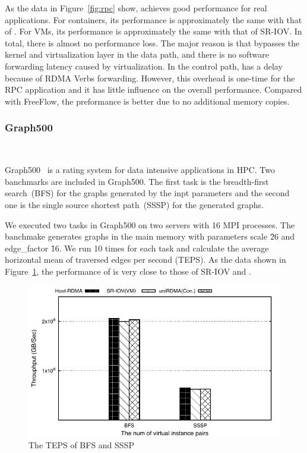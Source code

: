 As the data in Figure~\ref{fig:rpc} show, \sys achieves good performance for real applications. For containers, its performance is approximately the same with that of \native. For VMs, its performance is approximately the same with that of SR-IOV. In total, there is almost no performance loss. The major reason is that \sys bypasses the kernel and virtualization layer in the data path, and there is no software forwarding latency caused by virtualization. In the control path, \sys has a delay because of RDMA Verbs forwarding. However, this overhead is one-time for the RPC application and it has little influence on the overall performance. Compared with FreeFlow, the preformance \sys is better due to no additional memory copies. 



\subsubsection{\textbf{Graph500}}
\
\noindent

Graph500~\cite{Graph500} is a rating system for data intensive applications in HPC. Two banchmarks are included in Graph500. The first task is the breadth-first search~(BFS) for the graphs generated by the inpt parameters and the second one is the single source shortest path~(SSSP) for the generated graphs. 

We executed two tasks in Graph500 on two servers with 16 MPI processes. The banchmake generates graphs in the main memory with parameters scale \= 26 and edge\_factor \= 16. We run 10 times for each task and calculate the average horizontal mean of traversed edges per second (TEPS). As the data shown in Figure~\ref{fig:graph500}, the performance of \sys is very close to those of SR-IOV and \native.

\begin{figure}[!ht]
	\centering
	\includegraphics[width=0.8\linewidth]{images/graph500.pdf}
	\caption{The TEPS of BFS and SSSP}
	\label{fig:graph500}
\end{figure}